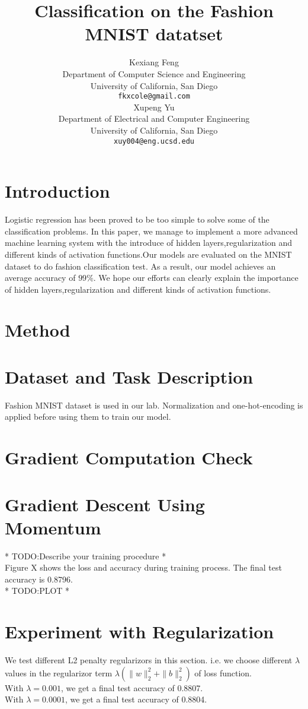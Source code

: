 \documentclass{article} %
\title{Classification on the Fashion MNIST datatset}
\author{
Kexiang Feng \\
Department of Computer Science and Engineering\\
University of California, San Diego\\
\texttt{fkxcole@gmail.com} \\
\And
Xupeng Yu \\
Department of Electrical and Computer Engineering \\
University of California, San Diego \\
\texttt{xuy004@eng.ucsd.edu}
}
\begin{document}
\maketitle

\begin{abstract}
	
\end{abstract}
\section{Introduction}
Logistic regression has been proved to be too simple to solve some of the classification problems. In this paper, we manage to implement a more advanced machine learning system with the introduce of hidden layers,regularization and different kinds of activation functions.Our models are evaluated on the MNIST dataset to do fashion classification test. As a result, our model  achieves an average accuracy of $ 99\% $. We hope our efforts can clearly explain the importance of hidden layers,regularization and different kinds of activation functions.
\section{Method}
\section{Dataset and Task Description}
Fashion MNIST dataset is used in our lab. Normalization and one-hot-encoding is applied before using them to train our model.
\section{Gradient Computation Check}

\section{Gradient Descent Using Momentum}
* TODO:Describe your training procedure *\\
Figure X shows the loss and accuracy during training process. The final test accuracy is 0.8796.\\
* TODO:PLOT * \\
\section{Experiment with Regularization}
We test different L2 penalty regularizors in this section. i.e. we choose different $\lambda$ values in the regularizor term $\lambda (\parallel w \parallel_2^2+\parallel b \parallel_2^2)$ of loss function. \\
With $\lambda = 0.001$, we get a final test accuracy of 0.8807. \\
With $\lambda = 0.0001$, we get a final test accuracy of 0.8804. \\
\end{document}
